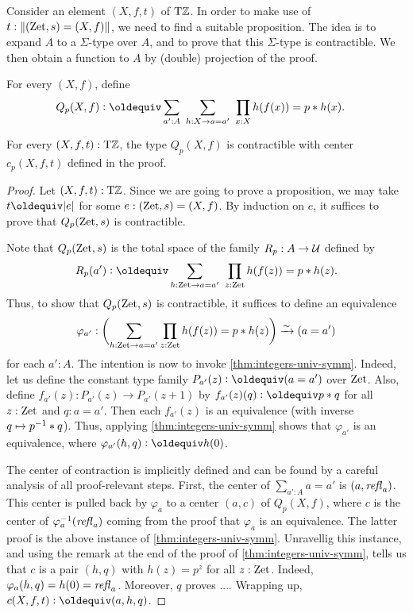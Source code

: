 \documentclass[a4,12pt]{amsart}
\begin{document}
Consider an element $(X,f,t)$ of ${\mathrm{T}\mathbb{Z}}$.
In order to make use of $t:\lVert(\mathrm{Zet},s)=(X,f)\rVert$, 
we need to find a suitable proposition.
The idea is to expand $A$ to a $\Sigma$-type over $A$,
and to prove that this $\Sigma$-type is contractible.
We then obtain a function to $A$ by (double) projection
of the proof.

\begin{definition}\label{def:TBN}
For every $(X,f)$, define
\begin{align*}\label{eq:TBD}
Q_p(X,f)&\defeq \sum_{a':A}~\sum_{h:X\to a=a'}~\prod_{x:X} h(f(x))=p\ct h(x).
\end{align*}
\end{definition}

\begin{lemma}\label{lem:guided-null-hmtps}
For every $(X,f,t):{\mathrm{T}\mathbb{Z}}$, the type $Q_p(X,f)$ is contractible
with center $c_p(X,f,t)$ defined in the proof.
\end{lemma}
\begin{proof}
  Let $(X,f,t):{\mathrm{T}\mathbb{Z}}$. Since we are going to prove a proposition,
  we may take $t\jdeq\trunc e$ for some $e : (\mathrm{Zet},s)=(X,f)$.
  By induction on $e$, it suffices to prove that $Q_p(\mathrm{Zet},s)$ is contractible.

  Note that $Q_p(\mathrm{Zet},s)$ is the total space of the family $R_p : A \to \mathcal{U}$ defined by
  \[
    R_p(a') \defeq \sum_{h:\zet \to a=a'}~\prod_{z:\zet} h(f(z))=p\ct h(z).
  \]
  Thus, to show that $Q_p(\mathrm{Zet},s)$ is contractible,
  it suffices to define an equivalence
  \[
    \varphi_{a'} : \biggl(\sum_{h:\mathrm{Zet} \to a=a'}\prod_{z:\mathrm{Zet}} h(f(z))=p* h(z)\biggr) \xrightarrow{\sim}{} (a=a')
  \]
  for each $a':A$.
  The intention is now to invoke \cref{thm:integers-univ-symm}.
  Indeed, let us define the constant type family $P_{a'}(z)\defeq(a=a')$
  over $\mathrm{Zet}$. Also, define $f_{a'}(z) : P_{a'}(z) \to P_{a'}(z+1)$
  by $f_{a'}(z)(q) \defeq p \ct q$ for all $z:\mathrm{Zet}$ and $q: a=a'$.
  Then each $f_{a'}(z)$ is an equivalence (with inverse $q \mapsto p^{-1}* q$).
  Thus, applying \cref{thm:integers-univ-symm}
  shows that $\varphi_{a'}$ is an equivalence,
  where $\varphi_{a'}(h,q) \defeq h(0)$.

The center of contraction is implicitly defined and can 
be found by a careful analysis of all proof-relevant steps.
First, the center of $\sum_{a':A} a=a'$ is $(a,\mathop{{\it refl}_{a}})$.
This center is pulled back by $\varphi_{a}$ to a center
$(a,c)$ of $Q_p(X,f)$, where $c$ is the center of 
$\varphi_{a}^{-1}(\mathop{{\it refl}_{a}})$ coming from the proof
that $\varphi_{a}$ is an equivalence. The latter proof
is the above instance of \cref{thm:integers-univ-symm}.
Unravellig this instance, and using the remark at the
end of the proof of \cref{thm:integers-univ-symm},
tells us that $c$ is a pair $(h,q)$ with $h(z)=p^z$
for all $z:\mathrm{Zet}$. Indeed, $\varphi_{a}(h,q) = h(0) = \mathop{{\it refl}_{a}}$.
Moreover, $q$ proves ....
Wrapping up, $c(X,f,t)\defeq (a,h,q)$.
\end{proof}
\end{document}
